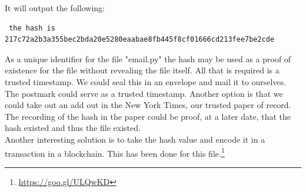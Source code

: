 \documentclass{tufte-handout}
\begin{document}

\normalsize
It will output the following:
\small
\begin{shaded}
\begin{verbatim}
 the hash is 
217c72a2b3a355bec2bda20e5280eaabae8fb445f8cf01666cd213fee7be2cde
\end{verbatim}
\end{shaded}



\normalsize
As a unique identifier for the file "email.py" the hash may be used as a proof of existence for the file without revealing the file itself.  All that is required is a trusted timestamp.  We could seal this in an envelope and mail it to ourselves.  The postmark could serve as a trusted timestamp.  Another option is that we could take out an add out in the New York Times, our trusted paper of record.  The recording of the hash in the paper could be proof, at a later date, that the hash existed and thus the file existed.\\
Another interesting solution is to take the hash value and encode it in a transaction in a blockchain.  This has been done for this file.\footnote{\href{url}{https://goo.gl/ULQwKD}}



%
%
\end{document}
